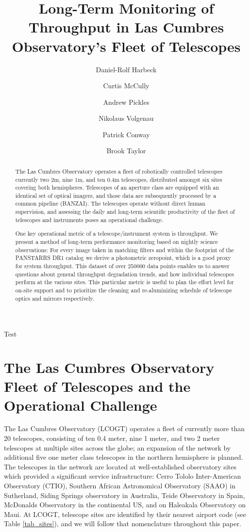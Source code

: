 \documentclass[draft]{spieman}
\title{Long-Term Monitoring of Throughput in Las Cumbres Observatory's Fleet of Telescopes}
\author[a]{Daniel-Rolf Harbeck}
\author[a]{Curtis McCully}
\author[a]{Andrew Pickles}
\author[a]{Nikolaus Volgenau}
\author[a,b]{Patrick Conway}
\author[a]{Brook Taylor}
\affil[a] {Las Cumbres Observatory, Goleta, CA (USA)}
\affil[b] {Telescope Technologies Limited, Liverpool, UK}
\begin{document}
\maketitle

\begin{abstract}
The Las Cumbres Observatory operates a fleet of robotically controlled telescopes currently two 2m,
nine 1m, and ten 0.4m telescopes, distributed amongst six sites covering both hemispheres.
Telescopes of an aperture class are equipped with an identical set of optical imagers, and those
data are subsequently processed by a common pipeline (BANZAI). The telescopes operate without direct
human supervision, and assessing the daily and long-term scientific productivity of the fleet of
telescopes and instruments poses an operational challenge.

One key operational metric of a telescope/instrument system is throughput. We present a method of
long-term performance monitoring based on nightly science observations: For every image taken in
matching filters and within the footprint of the PANSTARRS DR1 catalog we derive a photometric
zeropoint, which is a good proxy for system throughput. This dataset of over $250000$ data points
enables us to answer questions about general throughput degradation trends, and how individual
telescopes perform at the various sites. This particular metric is useful to plan the effort level
for on-site support and to prioritize the cleaning and re-aluminizing schedule of telescope optics
and mirrors respectively.
\end{abstract}


Test

\section{The Las Cumbres Observatory Fleet of Telescopes and the Operational Challenge}

The Las Cumbres Observatory (LCOGT) operates a fleet of currently more than 20 telescopes,
consisting of ten 0.4 meter, nine 1 meter, and two 2 meter telescopes at multiple sites across the
globe\cite{brown2013}; an expansion of the network by additional five one meter class telescopes in
the northern hemisphere is planned. The telescopes in the network are located at well-established
observatory sites which provided a significant service infrastructure: Cerro Tololo Inter-American
Observatory (CTIO), Southern African Astronomical Observatory (SAAO) in Sutherland, Siding Springs
observatory in Australia, Teide Observatory in Spain, McDonalds Observatory in the continental US,
and on Haleakala Observatory on Maui. At LCOGT, telescope sites are identified by their nearest
airport code (see Table \ref{tab_sites}), and we will follow that nomenclature throughout this
paper.
\end{document}
